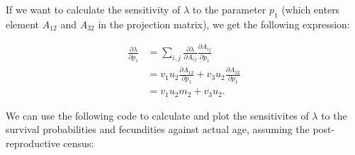 \documentclass[
]{book}
\begin{document}
If we want to calculate the sensitivity of \(\lambda\) to the parameter \(p_1\) (which enters element \(A_{12}\) and \(A_{32}\) in the projection matrix), we get the following expression:

\begin{align}
\frac{\partial \lambda}{\partial p_1}&=\sum_{i,j} \frac{\partial \lambda}{\partial A_{ij}} \frac{\partial A_{ij}}{\partial p_1}\\
&= v_1u_2 \frac{\partial A_{12}}{\partial p_1}+ v_3u_2 \frac{\partial A_{32}}{\partial p_1}\\
&= v_1u_2 m_2+ v_3u_2. 
\end{align}

We can use the following code to calculate and plot the sensitivites of \(\lambda\) to the survival probabilities and fecundities against actual age, assuming the post-reproductive census:
\end{document}
